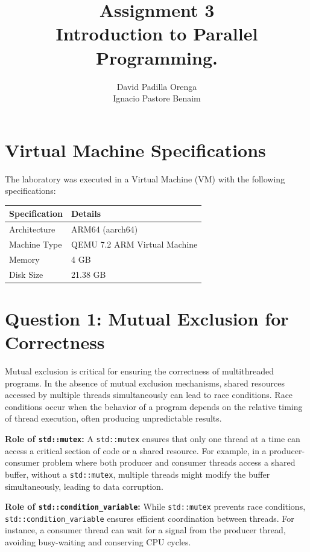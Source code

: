 \documentclass{article}
\title{Assignment 3 \\ \small Introduction to Parallel Programming.}
\author{David Padilla Orenga\\ Ignacio Pastore Benaim}
\date{}
\begin{document}
\maketitle

\section*{Virtual Machine Specifications}
The laboratory was executed in a Virtual Machine (VM) with the following specifications:

\begin{table}[h!]
\centering
\begin{tabular}{|l|l|}
\hline
\textbf{Specification} & \textbf{Details} \\ \hline
Architecture           & ARM64 (aarch64)  \\ \hline
Machine Type           & QEMU 7.2 ARM Virtual Machine \\ \hline
Memory                 & 4 GB             \\ \hline
Disk Size              & 21.38 GB         \\ \hline
\end{tabular}
\end{table}

\section*{Question 1: Mutual Exclusion for Correctness}
Mutual exclusion is critical for ensuring the correctness of multithreaded programs. In the absence of mutual exclusion mechanisms, shared resources accessed by multiple threads simultaneously can lead to race conditions. Race conditions occur when the behavior of a program depends on the relative timing of thread execution, often producing unpredictable results.

\textbf{Role of \texttt{std::mutex}:}  
A \texttt{std::mutex} ensures that only one thread at a time can access a critical section of 
code or a shared resource. For example, in a producer-consumer problem where both producer 
and consumer threads access a shared buffer, without a \texttt{std::mutex}, multiple threads might modify the buffer simultaneously, 
leading to data corruption.


\textbf{Role of \texttt{std::condition\_variable}:}  
While \texttt{std::mutex} prevents race conditions, \texttt{std::condition\_variable} ensures efficient coordination between threads. For instance, a consumer thread can wait for a signal from the producer thread, avoiding busy-waiting and conserving CPU cycles.
\end{document}
